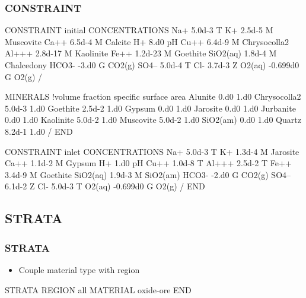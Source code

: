 \documentclass{beamer}
\begin{document}
\newpage

\begin{frame}\frametitle{\bf CONSTRAINT}

\begin{semiverbatim}

CONSTRAINT initial
  CONCENTRATIONS
    Na+        5.0d-3   T
    K+         2.5d-5   M Muscovite
    Ca++       6.5d-4   M Calcite
    H+         8.d0    pH
    Cu++       6.4d-9   M Chrysocolla2
    Al+++      2.8d-17  M Kaolinite
    Fe++       1.2d-23  M Goethite
    SiO2(aq)   1.8d-4   M Chalcedony
    HCO3-      -3.d0    G CO2(g)
    SO4--      5.0d-4   T
    Cl-        3.7d-3   Z
    O2(aq)     -0.699d0 G O2(g)
  /
\end{semiverbatim}

  \newpage
\begin{semiverbatim}

  MINERALS !volume fraction specific surface area
    Alunite       0.d0    1.d0
    Chrysocolla2  5.0d-3  1.d0
    Goethite      2.5d-2  1.d0
    Gypsum        0.d0    1.d0
    Jarosite      0.d0    1.d0
    Jurbanite     0.d0    1.d0
    Kaolinite     5.0d-2  1.d0
    Muscovite     5.0d-2  1.d0
    SiO2(am)      0.d0    1.d0
    Quartz        8.2d-1  1.d0
  /
END
\end{semiverbatim}

\newpage
\begin{semiverbatim}
CONSTRAINT inlet
  CONCENTRATIONS
    Na+        5.0d-3   T
    K+         1.3d-4   M Jarosite
    Ca++       1.1d-2   M Gypsum
    H+         1.d0    pH
    Cu++       1.0d-8   T 
    Al+++      2.5d-2   T 
    Fe++       3.4d-9   M Goethite
    SiO2(aq)   1.9d-3   M SiO2(am)
    HCO3-      -2.d0    G CO2(g)
    SO4--      6.1d-2   Z
    Cl-        5.0d-3   T
    O2(aq)     -0.699d0 G O2(g)
  /
END
\end{semiverbatim}

\end{frame}

\subsection{STRATA}

\begin{frame}[fragile]\frametitle{\bf STRATA}

\begin{itemize}
\item Couple material type with region
\end{itemize}

\begin{semiverbatim}
STRATA
  REGION all
  MATERIAL oxide-ore
END
\end{semiverbatim}

\end{frame}
\end{document}
